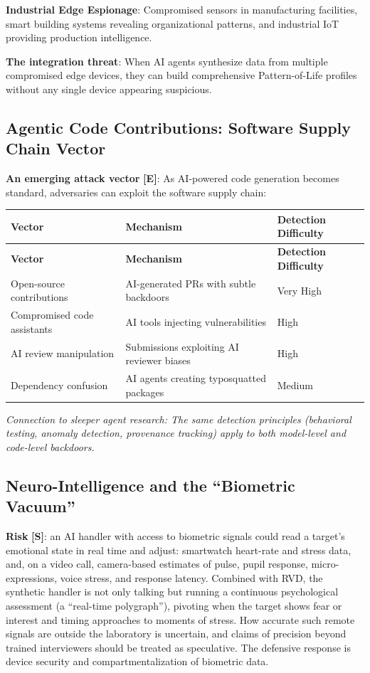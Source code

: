 \documentclass[11pt,letterpaper]{article}
\begin{document}
\textbf{Industrial Edge Espionage}: Compromised sensors in manufacturing facilities, smart building systems revealing organizational patterns, and industrial IoT providing production intelligence.

\textbf{The integration threat}: When AI agents synthesize data from multiple compromised edge devices, they can build comprehensive Pattern-of-Life profiles without any single device appearing suspicious.

\subsection{Agentic Code Contributions: Software Supply Chain Vector}

\textbf{An emerging attack vector} \textbf{[E]}: As AI-powered code generation becomes standard, adversaries can exploit the software supply chain:

{\small
\begin{longtable}{L{3.5cm}L{5cm}L{3.5cm}}
\toprule
\textbf{Vector} & \textbf{Mechanism} & \textbf{Detection Difficulty} \\
\midrule
\endfirsthead
\toprule
\textbf{Vector} & \textbf{Mechanism} & \textbf{Detection Difficulty} \\
\midrule
\endhead
Open-source contributions & AI-generated PRs with subtle backdoors & Very High \\*
Compromised code assistants & AI tools injecting vulnerabilities & High \\
AI review manipulation & Submissions exploiting AI reviewer biases & High \\*
Dependency confusion & AI agents creating typosquatted packages & Medium \\
\bottomrule
\end{longtable}}

\textit{Connection to sleeper agent research: The same detection principles (behavioral testing, anomaly detection, provenance tracking) apply to both model-level and code-level backdoors.}

\subsection{Neuro-Intelligence and the ``Biometric Vacuum''}

\textbf{Risk} \textbf{[S]}: an AI handler with access to biometric signals could read a target's emotional state in real time and adjust: smartwatch heart-rate and stress data, and, on a video call, camera-based estimates of pulse, pupil response, micro-expressions, voice stress, and response latency. Combined with RVD, the synthetic handler is not only talking but running a continuous psychological assessment (a ``real-time polygraph''), pivoting when the target shows fear or interest and timing approaches to moments of stress. How accurate such remote signals are outside the laboratory is uncertain, and claims of precision beyond trained interviewers should be treated as speculative. The defensive response is device security and compartmentalization of biometric data.
\end{document}
